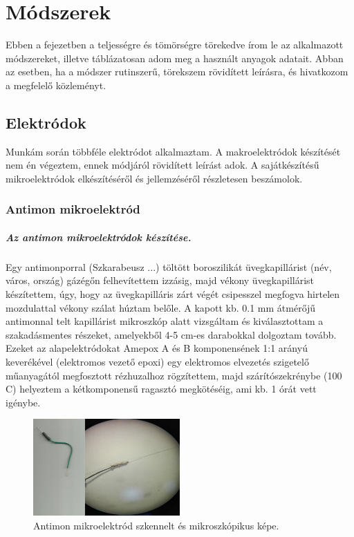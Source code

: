 \chapter{Módszerek}
\pagestyle{headings}

Ebben a fejezetben a teljességre és tömörségre törekedve írom le az alkalmazott módszereket, illetve táblázatosan adom meg a használt anyagok adatait. Abban az esetben, ha a módszer rutinszerű, törekszem rövidített leírásra, és hivatkozom a megfelelő közleményt.

\section{Elektródok}

Munkám során többféle elektródot alkalmaztam. A makroelektródok készítését nem én végeztem, ennek módjáról rövidített leírást adok. A sajátkészítésű mikroelektródok elkészítéséről és jellemzéséről részletesen beszámolok.

\subsection{Antimon mikroelektród}
\paragraph{Az antimon mikroelektródok készítése.}
Egy antimonporral (Szkarabeusz ...) töltött boroszilikát üvegkapillárist (név, város, ország) gázégőn felhevítettem izzásig, majd vékony üvegkapillárist készítettem, úgy, hogy az üvegkapilláris zárt végét csipesszel megfogva hirtelen mozdulattal vékony szálat húztam belőle. A kapott kb. 0.1 mm átmérőjű antimonnal telt kapillárist mikroszkóp alatt vizsgáltam és kiválasztottam a szakadásmentes részeket, amelyekből 4-5 cm-es darabokkal dolgoztam tovább. Ezeket az alapelektródokat Amepox A és B komponensének 1:1 arányú keverékével (elektromos vezető epoxi) egy elektromos elvezetés szigetelő műanyagától megfosztott rézhuzalhoz rögzítettem, majd szárítószekrénybe (100 \textdegree C) helyeztem a kétkomponensű ragasztó megkötéséig, ami kb. 1 órát vett igénybe.

\begin{figure}[h]
\centering
\includegraphics[width=0.5\textwidth]{img/antimon.png}
\caption{Antimon mikroelektród szkennelt és mikroszkópikus képe.}
\label{fig:ionophores}
\end{figure}

